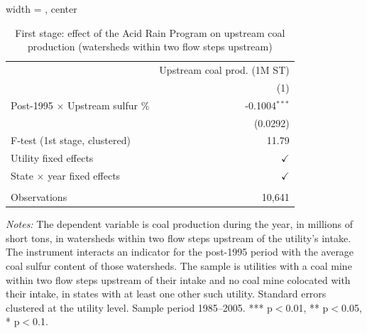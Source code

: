 
\begin{table}[htbp]
   
   \caption{\label{tab:fs_dwnstrm_minevio_ivsum_k2annprod} First stage: effect of the Acid Rain Program on upstream coal production (watersheds within two flow steps upstream)}
   \bigskip
   
   \centering
   
   \begin{adjustbox}{width = \textwidth, center}
      
      
      \begin{tabular}{lr}
         \toprule
         
                                                 & Upstream coal prod. (1M ST)\\  
         
                                                 & (1)\\  
         
         \midrule 
         Post-1995 $\times$ Upstream sulfur \%   & -0.1004$^{***}$\\   
                                                 & (0.0292)\\   
         
         F-test (1st stage, clustered)           & 11.79\\  
         
         Utility fixed effects                   & $\checkmark$\\   
         
         State $\times$ year fixed effects       & $\checkmark$\\   
         
          \\
         
         Observations                            & 10,641\\  
         
         \bottomrule
         
      \end{tabular}
      
      
      
   \end{adjustbox}
      {\tiny\linespread{1}\selectfont \par \raggedright 
   \textit{Notes:} The dependent variable is coal production during the year, in millions of short tons, in watersheds within two flow steps upstream of the utility's intake. The instrument interacts an indicator for the post-1995 period with the average coal sulfur content of those watersheds. The sample is utilities with a coal mine within two flow steps upstream of their intake and no coal mine colocated with their intake, in states with at least one other such utility. Standard errors clustered at the utility level. Sample period 1985--2005. *** p$<$0.01, ** p$<$0.05, * p$<$0.1.}
   
\end{table}


